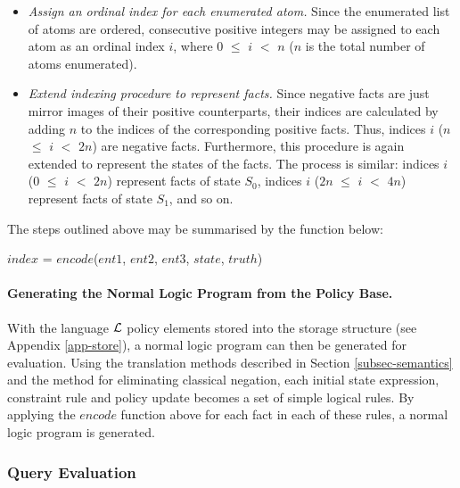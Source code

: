 \documentclass[global,twocolumn,final]{svjour}
\newenvironment{vquote}
  {\begin{list}{}{\leftmargin 1em}\item[]}
  {\end{list}}
\begin{document}
\begin{itemize}
            \item
              {\em Assign an ordinal index for each enumerated atom.}
              Since the enumerated list of atoms are ordered, consecutive
              positive integers may be assigned to each atom as an ordinal
              index $i$, where $0$ $\leq$ $i$ $<$ $n$ ($n$ is the total
              number of atoms enumerated).

            \item
              {\em Extend indexing procedure to represent facts.} Since
              negative facts are just mirror images of their positive
              counterparts, their indices are calculated by adding $n$ to the
              indices of the corresponding positive facts. Thus, indices $i$
              ($n$ $\leq$ $i$ $<$ $2n$) are negative facts. Furthermore, this
              procedure is again extended to represent the states of the
              facts. The process is similar: indices $i$ ($0$ $\leq$ $i$ $<$
              $2n$) represent facts of state $S_{0}$, indices $i$ ($2n$ $\leq$
              $i$ $<$ $4n$) represent facts of state $S_{1}$, and so on.
          \end{itemize}

          The steps outlined above may be summarised by the function below:

          \begin{vquote}
            $index$ = $encode$($ent1$, $ent2$, $ent3$, $state$, $truth$)
          \end{vquote}

        \paragraph{Generating the Normal Logic Program from the Policy Base.}

          With the language ${\cal L}$ policy elements stored into the storage
          structure (see Appendix \ref{app-store}), a normal logic program can
          then be generated for evaluation. Using the translation methods
          described in Section \ref{subsec-semantics} and the method for
          eliminating classical negation, each initial state expression,
          constraint rule and policy update becomes a set of simple logical
          rules. By applying the $encode$ function above for each fact in each
          of these rules, a normal logic program is generated.

      \subsubsection{Query Evaluation}
\end{document}
